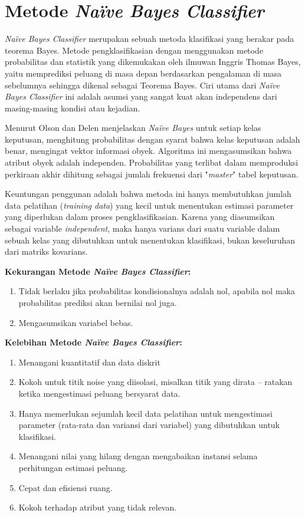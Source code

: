 \section{Metode \textit{Naïve Bayes Classifier}}
\textit{Naïve Bayes Classifier} merupakan sebuah metoda klasifikasi yang berakar pada teorema Bayes. Metode pengklasifikasian dengan menggunakan metode probabilitas dan statistik yang dikemukakan oleh ilmuwan Inggris Thomas Bayes, yaitu memprediksi peluang di masa depan berdasarkan pengalaman di masa sebelumnya sehingga dikenal sebagai Teorema Bayes. Ciri utama dari \textit{Naïve Bayes Classifier} ini adalah asumsi yang sangat kuat akan independens dari masing-masing kondisi atau kejadian.
\par Menurut Olson dan Delen menjelaskan \textit{Naïve Bayes} untuk setiap kelas keputusan, menghitung probabilitas dengan syarat bahwa kelas keputusan adalah benar, mengingat vektor informasi obyek. Algoritma ini mengasumsikan bahwa atribut obyek adalah independen. Probabilitas yang terlibat dalam memproduksi perkiraan akhir dihitung sebagai jumlah frekuensi dari "\textit{master}" tabel keputusan.
\par Keuntungan penggunan adalah bahwa metoda ini hanya membutuhkan jumlah data pelatihan (\textit{training data}) yang kecil untuk menentukan estimasi parameter yang diperlukan dalam proses pengklasifikasian. Karena yang diasumsikan sebagai variable \textit{independent}, maka hanya varians dari suatu variable dalam sebuah kelas yang dibutuhkan untuk menentukan klasifikasi, bukan keseluruhan dari matriks kovarians.


\par \textbf{Kekurangan Metode \textit{Naïve Bayes Classifier}:}
\begin{enumerate}
    \item 	Tidak berlaku jika probabilitas kondisionalnya adalah nol, apabila nol maka probabilitas prediksi akan bernilai nol juga.
	\item Mengasumsikan variabel bebas.
\end{enumerate}

\par \textbf{Kelebihan Metode \textit{Naïve Bayes Classifier}:}
\begin{enumerate}
    \item Menangani kuantitatif dan data diskrit
    \item Kokoh untuk titik noise yang diisolasi, misalkan titik yang dirata – ratakan ketika mengestimasi peluang bersyarat data.
    \item Hanya memerlukan sejumlah kecil data pelatihan untuk mengestimasi parameter (rata-rata dan variansi dari variabel) yang dibutuhkan untuk klasifikasi.
    \item Menangani nilai yang hilang dengan mengabaikan instansi selama perhitungan estimasi peluang.
    \item Cepat dan efisiensi ruang.
	\item Kokoh terhadap atribut yang tidak relevan.
\end{enumerate}

